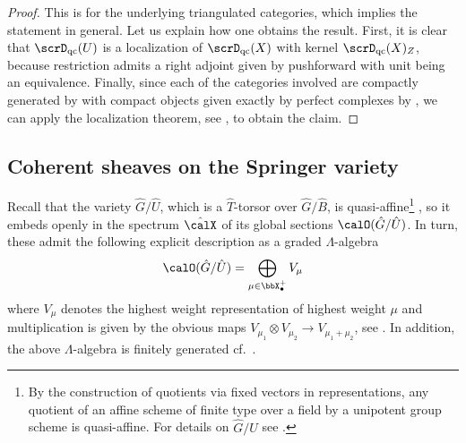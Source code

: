 \documentclass[10pt, reqno]{amsart}
\theoremstyle{plain}
\newtheorem{proposition}[theorem]{Proposition}
\theoremstyle{definition}
\numberwithin{equation}{section}
\begin{document}
\begin{proof}
	This is \cite[Theorem 3.4, Equation (3.6)]{KR18} for the underlying triangulated categories, which implies the statement in general. Let us explain how one obtains the result. First, it is clear that $\scrD_{\mathrm{qc}}(U)$ is a localization of $\scrD_{\mathrm{qc}}(X)$ with kernel $\scrD_{\mathrm{qc}}(X)_Z$, because restriction admits a right adjoint given by pushforward with unit being an equivalence. Finally, since each of the categories involved are compactly generated by \cite[Theorem B]{HR17} with compact objects given exactly by perfect complexes by \cite[Lemma 4.4]{HR17}, we can apply the localization theorem, see \cite[Theorem 3.12]{HR17}, to obtain the claim.
\end{proof}



\subsection{Coherent sheaves on the Springer variety}
Recall that the variety $\hat{G}/\hat{U}$, which is a $\hat{T}$-torsor over $\hat{G}/\hat{B}$, is quasi-affine\footnote{By the construction of quotients via fixed vectors in representations, any quotient of an affine scheme of finite type over a field by a unipotent group scheme is quasi-affine. For details on $\hat{G}/\hat{U}$ see \cite[Subsection 6.2.1]{AR}.} , so it embeds openly in the spectrum $\hat{\calX}$ of its global sections $\calO(\hat{G}/\hat{U})$. In turn, these admit the following explicit description as a graded $\Lambda$-algebra
\begin{equation}
	\calO(\hat{G}/\hat{U})=\bigoplus_{\mu \in \bbX_\bullet^+} V_\mu
\end{equation}
where $V_\mu$ denotes the highest weight representation of highest weight $\mu$ and multiplication is given by the obvious maps $V_{\mu_1} \otimes V_{\mu_2} \to V_{\mu_1+\mu_2}$, see \cite[Lemma 1.5.1,~Section 1.5.2,~Lemma 6.2.1]{AR}. In addition, the above $\Lambda$-algebra is finitely generated cf.\ \cite[Proposition 1.2.1]{Ful93}. 
\end{document}

